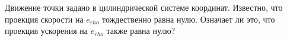 Движение точки задано в цилиндрической системе координат. Известно,
что проекция скорости на $e_{rho}$ тождественно равна нулю.
Означает ли это, что проекция ускорения на $e_{rho}$ также равна нулю?
